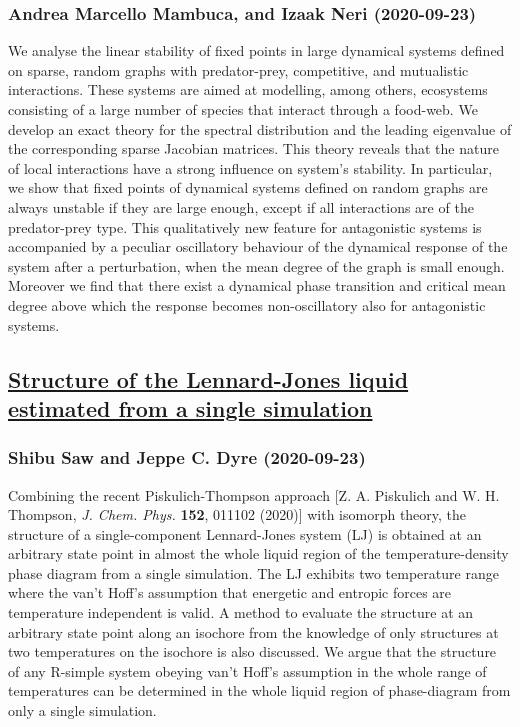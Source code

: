 \subsubsection*{Andrea Marcello Mambuca, and Izaak Neri (2020-09-23)}
We analyse the linear stability of fixed points in large dynamical systems
defined on sparse, random graphs with predator-prey, competitive, and
mutualistic interactions. These systems are aimed at modelling, among others,
ecosystems consisting of a large number of species that interact through a
food-web. We develop an exact theory for the spectral distribution and the
leading eigenvalue of the corresponding sparse Jacobian matrices. This theory
reveals that the nature of local interactions have a strong influence on
system's stability. In particular, we show that fixed points of dynamical
systems defined on random graphs are always unstable if they are large enough,
except if all interactions are of the predator-prey type. This qualitatively
new feature for antagonistic systems is accompanied by a peculiar oscillatory
behaviour of the dynamical response of the system after a perturbation, when
the mean degree of the graph is small enough. Moreover we find that there exist
a dynamical phase transition and critical mean degree above which the response
becomes non-oscillatory also for antagonistic systems.

\subsection*{\href{http://arxiv.org/abs/2009.11209v1}{Structure of the Lennard-Jones liquid estimated from a single simulation}}
\subsubsection*{Shibu Saw and Jeppe C. Dyre (2020-09-23)}
Combining the recent Piskulich-Thompson approach [Z. A. Piskulich and W. H.
Thompson, {\it J. Chem. Phys.} {\bf 152}, 011102 (2020)] with isomorph theory,
the structure of a single-component Lennard-Jones system (LJ) is obtained at an
arbitrary state point in almost the whole liquid region of the
temperature-density phase diagram from a single simulation. The LJ exhibits two
temperature range where the van't Hoff's assumption that energetic and entropic
forces are temperature independent is valid. A method to evaluate the structure
at an arbitrary state point along an isochore from the knowledge of only
structures at two temperatures on the isochore is also discussed. We argue that
the structure of any R-simple system obeying van't Hoff's assumption in the
whole range of temperatures can be determined in the whole liquid region of
phase-diagram from only a single simulation.

